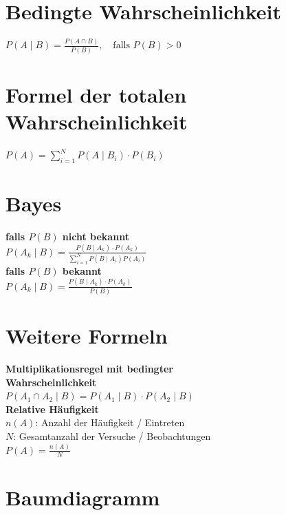 \documentclass[12pt]{article}
\begin{document}
   \hfill
   \begin{minipage}[t]{0.45\textwidth}

      \section*{Bedingte Wahrscheinlichkeit} 
         \(P(A \mid B) = \frac{P(A \cap B)}{P(B)}, \quad \text{falls } P(B) > 0\)

      \section*{Formel der totalen Wahrscheinlichkeit}
         \(P(A) = \sum_{i=1}^N P(A \mid B_i) \cdot P(B_i)\)

      \section*{Bayes}
         \textbf{falls \(P(B)\) nicht bekannt} \\[10pt]
            \(P(A_k \mid B) = \frac{P(B \mid A_k) \cdot P(A_k)}{\sum_{i=1}^N P(B \mid A_i) P(A_i)}\) \\[10pt]
         \textbf{falls \(P(B)\) bekannt} \\[10pt]
            \(P(A_k \mid B) = \frac{P(B \mid A_k) \cdot P(A_k)}{P(B)}\)

      \section*{Weitere Formeln}

         \textbf{Multiplikationsregel mit bedingter \\ Wahrscheinlichkeit} \\[10pt]
            \(P(A_1 \cap A_2 \mid B) = P(A_1 \mid B) \cdot P(A_2 \mid B)\) \\

         \textbf{Relative Häufigkeit} \\[5pt]
            \(n(A)\): Anzahl der Häufigkeit / Eintreten \\[5pt]
            \(N\): Gesamtanzahl der Versuche / Beobachtungen \\[5pt]
            \(P(A) = \frac{n(A)}{N}\)

      \section*{Baumdiagramm}


\end{minipage}
\end{document}
